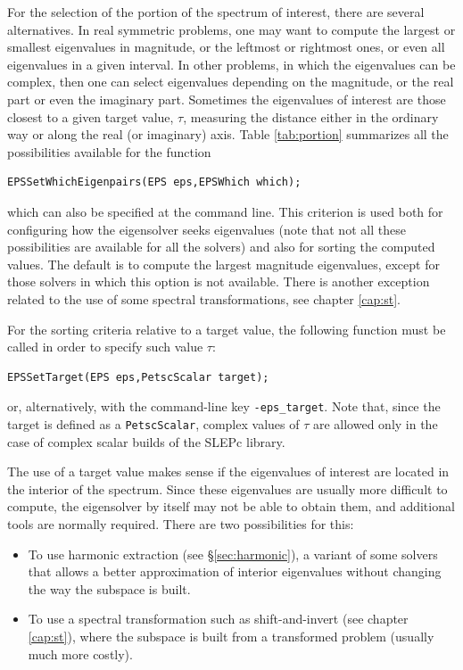 	For the selection of the portion of the spectrum of interest, there are several alternatives. In real symmetric problems, one may want to compute the largest or smallest eigenvalues in magnitude, or the leftmost or rightmost ones, or even all eigenvalues in a given interval. In other problems, in which the eigenvalues can be complex, then one can select eigenvalues depending on the magnitude, or the real part or even the imaginary part. Sometimes the eigenvalues of interest are those closest to a given target value, $\tau$, measuring the distance either in the ordinary way or along the real (or imaginary) axis. Table \ref{tab:portion} summarizes all the possibilities available for the function
	\begin{Verbatim}[fontsize=\small]
	EPSSetWhichEigenpairs(EPS eps,EPSWhich which);
	\end{Verbatim}
which can also be specified at the command line. This criterion is used both for configuring how the eigensolver seeks eigenvalues (note that not all these possibilities are available for all the solvers) and also for sorting the computed values. The default is to compute the largest magnitude eigenvalues, except for those solvers in which this option is not available. There is another exception related to the use of some spectral transformations, see chapter \ref{cap:st}.

	For the sorting criteria relative to a target value, the following function must be called in order to specify such value $\tau$:
	\begin{Verbatim}[fontsize=\small]
	EPSSetTarget(EPS eps,PetscScalar target);
	\end{Verbatim}
or, alternatively, with the command-line key \Verb!-eps_target!. Note that, since the target is defined as a \texttt{PetscScalar}, complex values of $\tau$ are allowed only in the case of complex scalar builds of the SLEPc library.

The use of a target value makes sense if the eigenvalues of interest are located in the interior of the spectrum. Since these eigenvalues are usually more difficult to compute, the eigensolver by itself may not be able to obtain them, and additional tools are normally required. 
There are two possibilities for this:
\begin{itemize}
\item To use harmonic extraction (see \S\ref{sec:harmonic}), a variant of some solvers that allows a better approximation of interior eigenvalues without changing the way the subspace is built.
\item To use a spectral transformation such as shift-and-invert (see chapter \ref{cap:st}), where the subspace is built from a transformed problem (usually much more costly).
\end{itemize}

